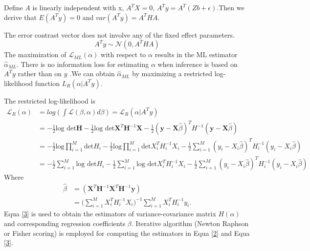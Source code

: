 \documentclass[12pt]{article}
\begin{document}
Define $A$ is linearly independent with x, $A^T X = 0$, $ A^T y = A^T ( Z b +\epsilon)$.Then we derive that $E(A^T y) = 0$ and $var(A^T y) = A^T H A$. 

The error contrast vector does not involve any of the fixed effect parameters. 
\begin{equation}\label{eq1} 
         A^T y \sim \mathcal{N}(0,A^T H A)
\end{equation}
The maximization of $\mathcal{L}_{ML}(\alpha)$  with respect to $\alpha$ results in the ML estimator $\widehat\alpha_{ML}$.
There is no information loss for estimating $\alpha$ when inference is based on $A^T y$ rather than on $y$ \cite{[Patterson and Thompson, 1971]}.We can obtain $\widehat\alpha_{ML}$ by maximizing a restricted log-likelihood function $L_R(\alpha| A^T y)$. 

The restricted log-likelihood\cite{[Harville, 1974]} is
\begin{equation}\label{3} 
\begin{split}
{\mathcal{L}}_R(\alpha) &= log(\int \mathcal{L}(\beta,\alpha)d\beta) ={\mathcal{L}}_R (\alpha| A^T y)\\
&= -\frac{1}{2}\text{log det}\bm{H}-\frac{1}{2}\text{log det}\bm{X}^T\bm{H}^{-1}\bm{X}-\frac{1}{2}(\bm{y}-\bm{X}\hat{\beta})^TH^{-1}(\bm{y}-\bm{X}\hat{\beta}) \\
&= -\frac{1}{2}\text{log}\prod_{i=1}^{M} \text{det}H_i-\frac{1}{2}\text{log}\prod_{i=1}^{M} \text{det} X_i^TH_i^{-1}X_i-\frac{1}{2}\sum_{i=1}^{M}(y_i-X_i\hat{\beta})^TH_i^{-1}(y_i-X_i\hat{\beta})\\
&= -\frac{1}{2}\sum_{i=1}^{M} \text{log det}H_i-\frac{1}{2}\sum_{i=1}^{M} \text{log det} X_i^TH_i^{-1}X_i-\frac{1}{2}\sum_{i=1}^{M}(y_i-X_i\hat{\beta})^TH_i^{-1}(y_i-X_i\hat{\beta})
\end{split}
\end{equation}
Where
\begin{equation}
\begin{split}
\hat{\beta}&=(\bm{X}^T\bm{H}^{-1}\bm{X}^T\bm{H}^{-1}\bm{y})\\
&=\bigl(\sum_{i=1}^{M}X_i^TH_i^{-1}X_i\bigr)^{-1}\sum_{i=1}^{M}X_i^TH_i^{-1}y_i.
\end{split}
\end{equation}
Equa \ref{3} is used to obtain the estimators of variance-covariance matrix $H(\alpha)$ and corresponding regression coefficients $\beta$.
Iterative algorithm (Newton Raphson or Fisher scoring) is employed for computing the estimators in Equa \ref{2} and Equa \ref{3}.\cite{ [Lindstromand Bates, 1988]}
\end{document}

